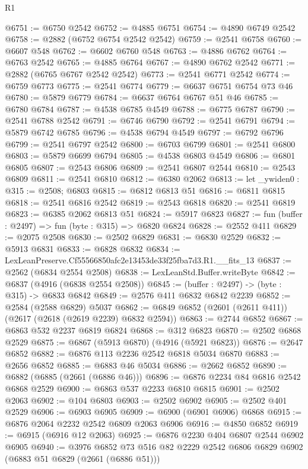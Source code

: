 \begin{lexlean}{R1}
\begin{coremodule}
@6751 := @6750 @2542
@6752 := @4885 @6751
@6754 := @4890 @6749 @2542
@6758 := @2882 (@6752 @6754 @2542 @2542)
@6759 := @2541 @6758
@6760 := @6607 @548
@6762 := @6602 @6760 @548
@6763 := @4886 @6762
@6764 := @6763 @2542
@6765 := @4885 @6764
@6767 := @4890 @6762 @2542
@6771 := @2882 (@6765 @6767 @2542 @2542)
@6773 := @2541 @6771 @2542
@6774 := @6759 @6773
@6775 := @2541 @6774
@6779 := @6637 @6751 @6754 @73 @46
@6780 := @5879 @6779
@6784 := @6637 @6764 @6767 @51 @46
@6785 := @6780 @6784
@6787 := @4538 @6785 @4549
@6788 := @6775 @6787
@6790 := @2541 @6788 @2542
@6791 := @6746 @6790
@6792 := @2541 @6791
@6794 := @5879 @6742 @6785
@6796 := @4538 @6794 @4549
@6797 := @6792 @6796
@6799 := @2541 @6797 @2542
@6800 := @6703 @6799
@6801 := @2541 @6800
@6803 := @5879 @6699 @6794
@6805 := @4538 @6803 @4549
@6806 := @6801 @6805
@6807 := @2543 @6806
@6809 := @2541 @6807 @2544
@6810 := @2543 @6809
@6811 := @2541 @6810
@6812 := @6380 @2062
@6813 := let _ywiden0 : @315 := @2508; @6803
@6815 := @6812 @6813 @51
@6816 := @6811 @6815
@6818 := @2541 @6816 @2542
@6819 := @2543 @6818
@6820 := @2541 @6819
@6823 := @6385 @2062 @6813 @51
@6824 := @5917 @6823
@6827 := fun (buffer : @2497) => fun (byte : @315) => @6820 @6824
@6828 := @2552 @411
@6829 := @2075 @2508
@6830 := @2502 @6829
@6831 := @6830 @2529
@6832 := @5913 @6831
@6833 := @6828 @6832
@6834 := LexLeanPreserve.Cf55566850afc2e13453de33f25fba7d3.R1.__fits_13
@6837 := @2562 (@6834 @2554 @2508)
@6838 := LexLeanStd.Buffer.writeByte
@6842 := @6837 (@4916 (@6838 @2554 @2508))
@6845 := (buffer : @2497) -> (byte : @315) -> @6833 @6842
@6849 := @2576 @411 @6832 @6842 @2239
@6852 := @2584 (@2588 @6829) @5037
@6862 := @6849 @6852 (@2601 (@2611 @411)) (@2617 (@2618 (@2619 @2239) @6832 @2594))
@6863 := @2744 @6852
@6867 := @6863 @532 @2237 @6819 @6824
@6868 := @312 @6823
@6870 := @2502 @6868 @2529
@6875 := @6867 (@5913 @6870) (@4916 (@5921 @6823))
@6876 := @2647 @6852
@6882 := @6876 @113 @2236 @2542 @6818 @5034 @6870
@6883 := @2656 @6852
@6885 := @6883 @46 @5034
@6886 := @2662 @6852
@6890 := @6882 (@6885 (@2661 (@6886 @46)))
@6896 := @6876 @2234 @84 @6816 @2542 @6868 @2529
@6900 := @6863 @537 @2233 @6810 @6815
@6901 := @2502 @2063
@6902 := @104 @6803
@6903 := @2502 @6902
@6905 := @2502 @401 @2529
@6906 := @6903 @6905
@6909 := @6900 (@6901 @6906) @6868
@6915 := @6876 @2064 @2232 @2542 @6809 @2063 @6906
@6916 := @4850 @6852
@6919 := @6915 (@6916 @12 @2063)
@6925 := @6876 @2230 @404 @6807 @2544 @6902 @6905
@6940 := @3976
    @6852
    @73
    @516
    @82
    @2229
    @2542
    @6806
    @6829
    @6902
    (@6883 @51 @6829 (@2661 (@6886 @51)))

\end{coremodule}
\end{lexlean}
